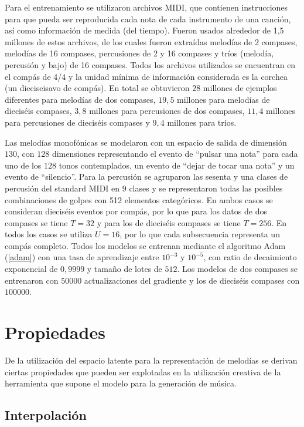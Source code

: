 Para el entrenamiento se utilizaron archivos MIDI, que contienen instrucciones para que pueda ser reproducida cada nota de cada instrumento de una canción, así como información de medida (del tiempo). Fueron usados alrededor de 1,5 millones de estos archivos, de los cuales fueron extraídas melodías de 2 compases, melodías de 16 compases, percusiones de 2 y 16 compases y tríos (melodía, percusión y bajo) de 16 compases. Todos los archivos utilizados se encuentran en el compás de 4/4 y la unidad mínima de información considerada es la corchea (un dieciseisavo de compás). En total se obtuvieron $28$ millones de ejemplos diferentes para melodías de dos compases, $19,5$ millones para melodías de dieciséis compases, $3,8$ millones para percusiones de dos compases, $11,4$ millones para percusiones de dieciséis compases y $9,4$ millones para tríos.

Las melodías monofónicas se modelaron con un espacio de salida de dimensión $130$, con $128$ dimensiones representando el evento de ``pulsar una nota'' para cada uno de los $128$ tonos contemplados, un evento de ``dejar de tocar una nota'' y un evento de ``silencio''. Para la percusión se agruparon las sesenta y una clases de percusión del standard MIDI en 9 clases y se representaron todas las posibles combinaciones de golpes con 512 elementos categóricos. En ambos casos se consideran dieciséis eventos por compás, por lo que para los datos de dos compases se tiene $T = 32$ y para los de dieciséis compases se tiene $T = 256$. En todos los casos se utiliza $U = 16$, por lo que cada subsecuencia representa un compás completo. Todos los modelos se entrenan mediante el algoritmo Adam (\ref{adam}) con una tasa de aprendizaje entre $10^{-3}$ y $10^{-5}$, con ratio de decaimiento exponencial de $0,9999$ y tamaño de lotes de $512$. Los modelos de dos compases se entrenaron con $50000$ actualizaciones del gradiente y los de dieciséis compases con $100000$.

\section{Propiedades}

De la utilización del espacio latente para la representación de melodías se derivan ciertas propiedades que pueden ser explotadas en la utilización creativa de la herramienta que supone el modelo para la generación de música.

\subsection{Interpolación}\label{interpolate}

